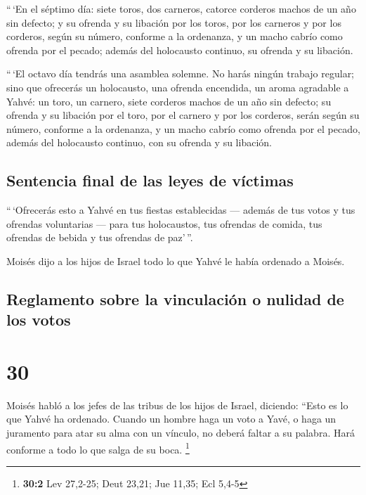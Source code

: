  ``\,`En el séptimo día: siete toros, dos carneros,
catorce corderos machos de un año sin defecto;  y su
ofrenda y su libación por los toros, por los carneros y por los
corderos, según su número, conforme a la ordenanza,  y un
macho cabrío como ofrenda por el pecado; además del holocausto continuo,
su ofrenda y su libación.

 ``\,`El octavo día tendrás una asamblea solemne. No
harás ningún trabajo regular;  sino que ofrecerás un
holocausto, una ofrenda encendida, un aroma agradable a Yahvé: un toro,
un carnero, siete corderos machos de un año sin defecto; 
su ofrenda y su libación por el toro, por el carnero y por los corderos,
serán según su número, conforme a la ordenanza,  y un
macho cabrío como ofrenda por el pecado, además del holocausto continuo,
con su ofrenda y su libación.

\hypertarget{sentencia-final-de-las-leyes-de-vuxedctimas}{%
\subsection{Sentencia final de las leyes de
víctimas}\label{sentencia-final-de-las-leyes-de-vuxedctimas}}

 ``\,`Ofrecerás esto a Yahvé en tus fiestas establecidas
--- además de tus votos y tus ofrendas voluntarias --- para tus
holocaustos, tus ofrendas de comida, tus ofrendas de bebida y tus
ofrendas de paz'\,''.

 Moisés dijo a los hijos de Israel todo lo que Yahvé le
había ordenado a Moisés.

\hypertarget{reglamento-sobre-la-vinculaciuxf3n-o-nulidad-de-los-votos}{%
\subsection{Reglamento sobre la vinculación o nulidad de los
votos}\label{reglamento-sobre-la-vinculaciuxf3n-o-nulidad-de-los-votos}}

\hypertarget{section-29}{%
\section{30}\label{section-29}}

 Moisés habló a los jefes de las tribus de los hijos de
Israel, diciendo: ``Esto es lo que Yahvé ha ordenado. 
Cuando un hombre haga un voto a Yavé, o haga un juramento para atar su
alma con un vínculo, no deberá faltar a su palabra. Hará conforme a todo
lo que salga de su boca. \footnote{\textbf{30:2} Lev 27,2-25; Deut
  23,21; Jue 11,35; Ecl 5,4-5}

